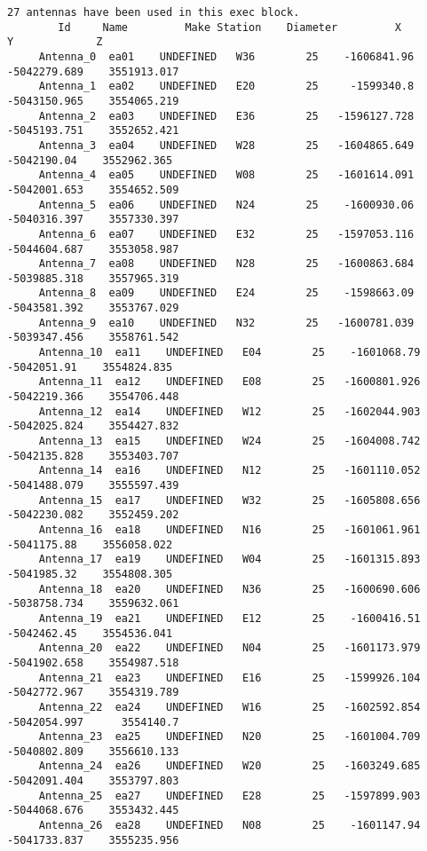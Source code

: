 \begin{verbatim}
27 antennas have been used in this exec block.
        Id     Name         Make Station    Diameter         X              Y             Z
     Antenna_0  ea01    UNDEFINED   W36        25    -1606841.96   -5042279.689    3551913.017
     Antenna_1  ea02    UNDEFINED   E20        25     -1599340.8   -5043150.965    3554065.219
     Antenna_2  ea03    UNDEFINED   E36        25   -1596127.728   -5045193.751    3552652.421
     Antenna_3  ea04    UNDEFINED   W28        25   -1604865.649    -5042190.04    3552962.365
     Antenna_4  ea05    UNDEFINED   W08        25   -1601614.091   -5042001.653    3554652.509
     Antenna_5  ea06    UNDEFINED   N24        25    -1600930.06   -5040316.397    3557330.397
     Antenna_6  ea07    UNDEFINED   E32        25   -1597053.116   -5044604.687    3553058.987
     Antenna_7  ea08    UNDEFINED   N28        25   -1600863.684   -5039885.318    3557965.319
     Antenna_8  ea09    UNDEFINED   E24        25    -1598663.09   -5043581.392    3553767.029
     Antenna_9  ea10    UNDEFINED   N32        25   -1600781.039   -5039347.456    3558761.542
     Antenna_10  ea11    UNDEFINED   E04        25    -1601068.79    -5042051.91    3554824.835
     Antenna_11  ea12    UNDEFINED   E08        25   -1600801.926   -5042219.366    3554706.448
     Antenna_12  ea14    UNDEFINED   W12        25   -1602044.903   -5042025.824    3554427.832
     Antenna_13  ea15    UNDEFINED   W24        25   -1604008.742   -5042135.828    3553403.707
     Antenna_14  ea16    UNDEFINED   N12        25   -1601110.052   -5041488.079    3555597.439
     Antenna_15  ea17    UNDEFINED   W32        25   -1605808.656   -5042230.082    3552459.202
     Antenna_16  ea18    UNDEFINED   N16        25   -1601061.961    -5041175.88    3556058.022
     Antenna_17  ea19    UNDEFINED   W04        25   -1601315.893    -5041985.32    3554808.305
     Antenna_18  ea20    UNDEFINED   N36        25   -1600690.606   -5038758.734    3559632.061
     Antenna_19  ea21    UNDEFINED   E12        25    -1600416.51    -5042462.45    3554536.041
     Antenna_20  ea22    UNDEFINED   N04        25   -1601173.979   -5041902.658    3554987.518
     Antenna_21  ea23    UNDEFINED   E16        25   -1599926.104   -5042772.967    3554319.789
     Antenna_22  ea24    UNDEFINED   W16        25   -1602592.854   -5042054.997      3554140.7
     Antenna_23  ea25    UNDEFINED   N20        25   -1601004.709   -5040802.809    3556610.133
     Antenna_24  ea26    UNDEFINED   W20        25   -1603249.685   -5042091.404    3553797.803
     Antenna_25  ea27    UNDEFINED   E28        25   -1597899.903   -5044068.676    3553432.445
     Antenna_26  ea28    UNDEFINED   N08        25    -1601147.94   -5041733.837    3555235.956


\end{verbatim}
